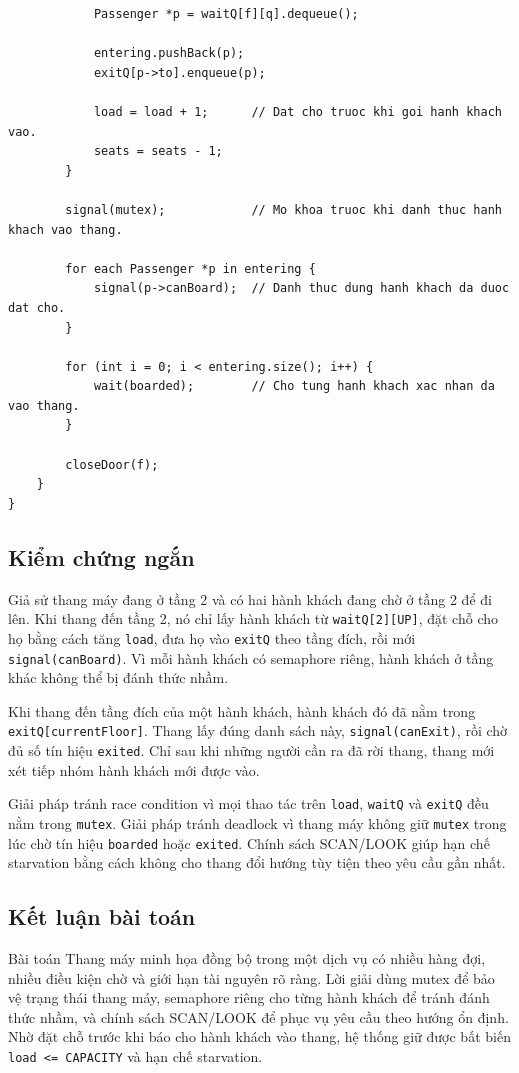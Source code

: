 \begin{lstlisting}
            Passenger *p = waitQ[f][q].dequeue();

            entering.pushBack(p);
            exitQ[p->to].enqueue(p);

            load = load + 1;      // Dat cho truoc khi goi hanh khach vao.
            seats = seats - 1;
        }

        signal(mutex);            // Mo khoa truoc khi danh thuc hanh khach vao thang.

        for each Passenger *p in entering {
            signal(p->canBoard);  // Danh thuc dung hanh khach da duoc dat cho.
        }

        for (int i = 0; i < entering.size(); i++) {
            wait(boarded);        // Cho tung hanh khach xac nhan da vao thang.
        }

        closeDoor(f);
    }
}
\end{lstlisting}

\subsection{Kiểm chứng ngắn}

Giả sử thang máy đang ở tầng 2 và có hai hành khách đang chờ ở tầng 2 để
đi lên. Khi thang đến tầng 2, nó chỉ lấy hành khách từ
\texttt{waitQ[2][UP]}, đặt chỗ cho họ bằng cách tăng \texttt{load}, đưa
họ vào \texttt{exitQ} theo tầng đích, rồi mới \texttt{signal(canBoard)}.
Vì mỗi hành khách có semaphore riêng, hành khách ở tầng khác không thể
bị đánh thức nhầm.

Khi thang đến tầng đích của một hành khách, hành khách đó đã nằm trong
\texttt{exitQ[currentFloor]}. Thang lấy đúng danh sách này,
\texttt{signal(canExit)}, rồi chờ đủ số tín hiệu \texttt{exited}. Chỉ sau
khi những người cần ra đã rời thang, thang mới xét tiếp nhóm hành khách
mới được vào.

Giải pháp tránh race condition vì mọi thao tác trên \texttt{load},
\texttt{waitQ} và \texttt{exitQ} đều nằm trong \texttt{mutex}. Giải pháp
tránh deadlock vì thang máy không giữ \texttt{mutex} trong lúc chờ tín
hiệu \texttt{boarded} hoặc \texttt{exited}. Chính sách SCAN/LOOK giúp hạn
chế starvation bằng cách không cho thang đổi hướng tùy tiện theo yêu cầu
gần nhất.

\subsection{Kết luận bài toán}

Bài toán Thang máy minh họa đồng bộ trong một dịch vụ có nhiều hàng đợi,
nhiều điều kiện chờ và giới hạn tài nguyên rõ ràng. Lời giải dùng mutex để
bảo vệ trạng thái thang máy, semaphore riêng cho từng hành khách để tránh
đánh thức nhầm, và chính sách SCAN/LOOK để phục vụ yêu cầu theo hướng ổn
định. Nhờ đặt chỗ trước khi báo cho hành khách vào thang, hệ thống giữ được
bất biến \texttt{load <= CAPACITY} và hạn chế starvation.

